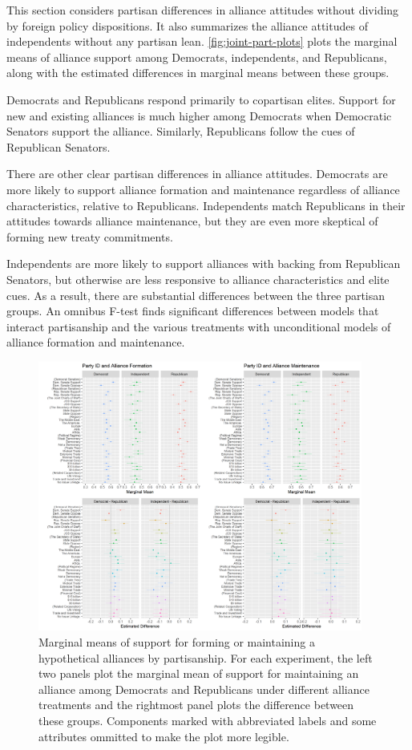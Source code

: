 \documentclass[12pt]{article}
\begin{document}
This section considers partisan differences in alliance attitudes without dividing by foreign policy dispositions. 
It also summarizes the alliance attitudes of independents without any partisan lean. 
\autoref{fig:joint-part-plots} plots the marginal means of alliance support among Democrats, independents, and Republicans, along with the estimated differences in marginal means between these groups. 


Democrats and Republicans respond primarily to copartisan elites.
Support for new and existing alliances is much higher among Democrats when Democratic Senators support the alliance.
Similarly, Republicans follow the cues of Republican Senators.


There are other clear partisan differences in alliance attitudes.
Democrats are more likely to support alliance formation and maintenance regardless of alliance characteristics, relative to Republicans. 
Independents match Republicans in their attitudes towards alliance maintenance, but they are even more skeptical of forming new treaty commitments. 


Independents are more likely to support alliances with backing from Republican Senators, but otherwise are less responsive to alliance characteristics and elite cues. 
As a result, there are substantial differences between the three partisan groups. 
An omnibus F-test finds significant differences between models that interact partisanship and the various treatments with unconditional models of alliance formation and maintenance. 


\begin{figure}
	\centering
		\includegraphics[width=0.95\textwidth]{joint-part-plots.png}
	\caption{Marginal means of support for forming or maintaining a hypothetical alliances by partisanship. For each experiment, the left two panels plot the marginal mean of support for maintaining an alliance among Democrats and Republicans under different alliance treatments and the rightmost panel plots the difference between these groups. Components marked with abbreviated labels and some attributes ommitted to make the plot more legible.}
	\label{fig:joint-part-plots}
\end{figure}
\end{document}

